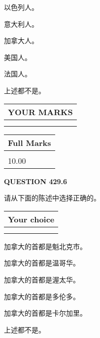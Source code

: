 \documentclass{ctexart}
\begin{document}
  
 
 
以色列人。
 
 
意大利人。
 
 
加拿大人。
 
 
美国人。
 
 
法国人。
 
 
 上述都不是。
 
 
  
\vspace{0.2in}
  
\noindent\begin{tabular}{|l|}
\hline
 YOUR MARKS  \\
\hline
 \\ 
 \\ 
\hline
\end{tabular}
\hspace{0.05in} \begin{tabular}{|l|}
\hline
 Full Marks  \\
\hline
 \\ 
10.00 \\
\hline
\end{tabular}
{\textbf{\Large{QUESTION
429.6 
}}}
  
  
请从下面的陈述中选择正确的。
  
  
\noindent\hspace{3.0in} \begin{tabular}{|l|}
\hline
Your choice \\
\hline
 \\ 
 \\ 
\hline
\end{tabular}
  
  
 
 
加拿大的首都是魁北克市。
 
 
加拿大的首都是温哥华。
 
 
加拿大的首都是渥太华。
 
 
加拿大的首都是多伦多。
 
 
加拿大的首都是卡尔加里。
 
 
 上述都不是。
 
 
  
\vspace{0.2in}
  
\end{document}
